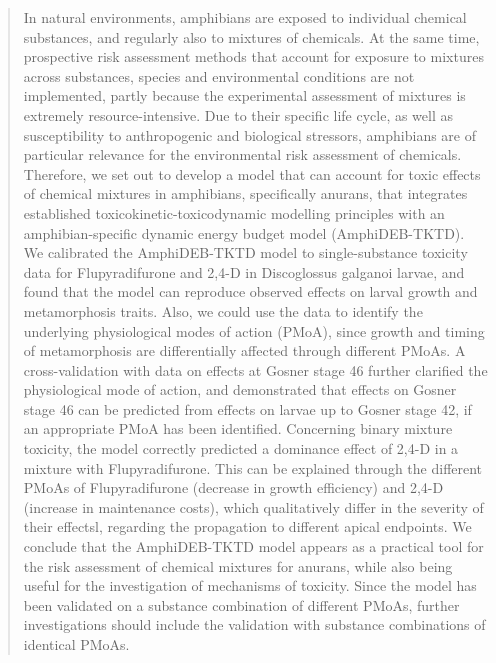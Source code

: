 \documentclass[preprint,12pt]{elsarticle}
\begin{document}
\begin{frontmatter}
\begin{abstract}
In natural environments, amphibians are exposed to individual chemical substances, and regularly also to mixtures of chemicals. 
At the same time, prospective risk assessment methods that account for exposure to mixtures across substances, 
species and environmental conditions are not implemented, partly because the experimental assessment of mixtures is extremely resource-intensive. 
Due to their specific life cycle, as well as susceptibility to anthropogenic and biological stressors, 
amphibians are of particular relevance for the environmental risk assessment of chemicals. 
Therefore, we set out to develop a model that can account for toxic effects of chemical mixtures in amphibians, specifically anurans, 
that integrates established toxicokinetic-toxicodynamic modelling principles with an amphibian-specific dynamic energy budget model (AmphiDEB-TKTD). 
We calibrated the AmphiDEB-TKTD model to single-substance toxicity data for Flupyradifurone and 2,4-D in Discoglossus galganoi larvae, 
and found that the model can reproduce observed effects on larval growth and metamorphosis traits. 
Also, we could use the data to identify the underlying physiological modes of action (PMoA), 
since growth and timing of metamorphosis are differentially affected through different PMoAs. 
A cross-validation with data on effects at Gosner stage 46 further clarified the physiological mode of action, 
and demonstrated that effects on Gosner stage 46 can be predicted from effects on larvae up to Gosner stage 42, 
if an appropriate PMoA has been identified. Concerning binary mixture toxicity, 
the model correctly predicted a dominance effect of 2,4-D in a mixture with Flupyradifurone. 
This can be explained through the different PMoAs of Flupyradifurone (decrease in growth efficiency) and 2,4-D (increase in maintenance costs), 
which qualitatively differ in the severity of their effectsl, regarding the propagation to different apical endpoints. 
We conclude that the AmphiDEB-TKTD model appears as a practical tool for the risk assessment of chemical mixtures for anurans, 
while also being useful for the investigation of mechanisms of toxicity. 
Since the model has been validated on a substance combination of different PMoAs, 
further investigations should include the validation with substance combinations of identical PMoAs. 

\end{abstract}

\begin{graphicalabstract}
\end{graphicalabstract}


\end{frontmatter}
\end{document}
